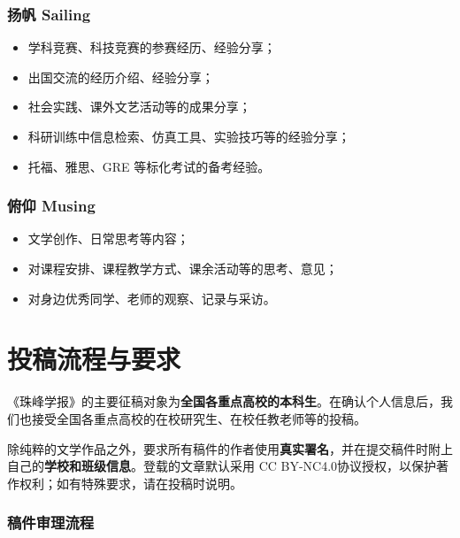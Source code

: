 \documentclass[
decoration,  %
]{qyxf-book}
\begin{document}
\begin{multicols}{2}
	
	\subsubsection{扬帆 Sailing}
	
	\begin{itemize}%
		\item
		学科竞赛、科技竞赛的参赛经历、经验分享；
		\item
		出国交流的经历介绍、经验分享；
		\item
		社会实践、课外文艺活动等的成果分享；
		\item
		科研训练中信息检索、仿真工具、实验技巧等的经验分享；
		\item
		托福、雅思、GRE 等标化考试的备考经验。
	\end{itemize}
	
	\subsubsection{俯仰 Musing}
	
	\begin{itemize}%
		\item
		文学创作、日常思考等内容；
		\item
		对课程安排、课程教学方式、课余活动等的思考、意见；
		\item
		对身边优秀同学、老师的观察、记录与采访。
	\end{itemize}
	
	\section*{投稿流程与要求}
	
    《珠峰学报》的主要征稿对象为\textbf{全国各重点高校的本科生}。在确认个人信息后，我们也接受全国各重点高校的在校研究生、在校任教老师等的投稿。
    
    除纯粹的文学作品之外，要求所有稿件的作者使用\textbf{真实署名}，并在提交稿件时附上自己的\textbf{学校和班级信息}。登载的文章默认采用 CC BY-NC4.0协议授权，以保护著作权利；如有特殊要求，请在投稿时说明。
	
	\subsubsection{稿件审理流程}
	

\end{multicols}
\end{document}
